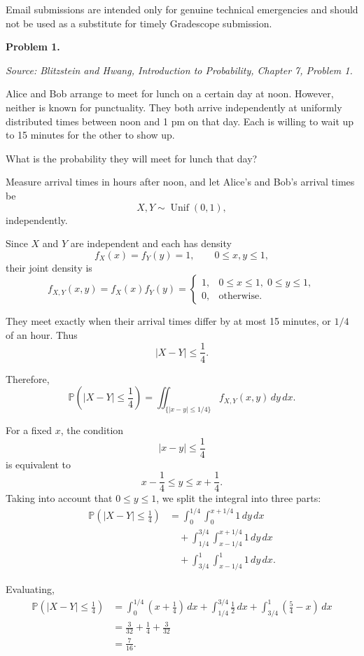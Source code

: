 \documentclass[11pt]{article}
\newcommand{\source}[2]{%
    \vspace{0.15cm}
    {\small\textit{Source: Blitzstein and Hwang, \textit{Introduction to Probability}, Chapter #1, Problem #2.}}
}
\begin{document}
Email submissions are intended only for genuine technical emergencies and should not be used as a substitute for timely Gradescope submission.

\newpage

\begin{problemheader}
\textbf{Problem 1.  }
\end{problemheader}
\source{7}{1}

Alice and Bob arrange to meet for lunch on a certain day at noon. However, neither is known for punctuality. They both arrive independently at uniformly distributed times between noon and 1 pm on that day. Each is willing to wait up to 15 minutes for the other to show up.

What is the probability they will meet for lunch that day?

\begin{solutionbox}
Measure arrival times in hours after noon, and let Alice's and Bob's arrival times be
\[
X,Y\sim \operatorname{Unif}(0,1),
\]
independently.

Since \(X\) and \(Y\) are independent and each has density
\[
f_X(x)=f_Y(y)=1,
\qquad 0\le x,y\le 1,
\]
their joint density is
\[
f_{X,Y}(x,y)
=
f_X(x)f_Y(y)
=
\begin{cases}
1, & 0\le x\le 1,\;0\le y\le 1,\\
0, & \text{otherwise}.
\end{cases}
\]

They meet exactly when their arrival times differ by at most 15 minutes, or \(1/4\) of an hour. Thus
\[
|X-Y|\le \frac14.
\]

Therefore,
\[
\mathbb P\left(|X-Y|\le \frac14\right)
=
\iint_{\{|x-y|\le 1/4\}} f_{X,Y}(x,y)\,dy\,dx.
\]

For a fixed \(x\), the condition
\[
|x-y|\le \frac14
\]
is equivalent to
\[
x-\frac14\le y\le x+\frac14.
\]
Taking into account that \(0\le y\le 1\), we split the integral into three parts:
\[
\begin{aligned}
\mathbb P\left(|X-Y|\le \frac14\right)
&=
\int_0^{1/4}\int_0^{x+1/4} 1\,dy\,dx\\
&\quad+
\int_{1/4}^{3/4}\int_{x-1/4}^{x+1/4} 1\,dy\,dx\\
&\quad+
\int_{3/4}^{1}\int_{x-1/4}^{1} 1\,dy\,dx.
\end{aligned}
\]

Evaluating,
\[
\begin{aligned}
\mathbb P\left(|X-Y|\le \frac14\right)
&=
\int_0^{1/4}\left(x+\frac14\right)\,dx
+
\int_{1/4}^{3/4}\frac12\,dx
+
\int_{3/4}^{1}\left(\frac54-x\right)\,dx\\
&=
\frac{3}{32}
+
\frac14
+
\frac{3}{32}\\
&=
\frac{7}{16}.
\end{aligned}
\]

\end{solutionbox}
\newpage
\end{document}
